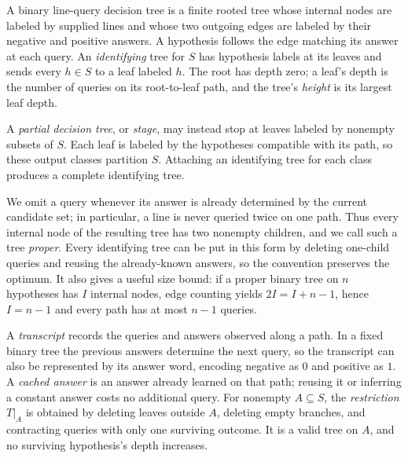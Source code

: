 \begin{definition}\label{def:decision-tree}
A binary line-query decision tree is a finite rooted tree whose
internal nodes are labeled by supplied lines and whose two outgoing
edges are labeled by their negative and positive answers. A
hypothesis follows the edge matching its answer at each query.
An \emph{identifying} tree for $S$ has hypothesis labels at its leaves
and sends every $h\in S$ to a leaf labeled $h$. The root has depth
zero; a leaf's depth is the number of queries on its root-to-leaf path,
and the tree's \emph{height} is its largest leaf depth.

A \emph{partial decision tree}, or \emph{stage}, may instead stop at
leaves labeled by nonempty subsets of $S$. Each leaf is labeled by
the hypotheses compatible with its path, so these output
classes partition $S$. Attaching an identifying tree for each class
produces a complete identifying tree.
\end{definition}

We omit a query whenever its answer is already determined by the
current candidate set; in particular, a line is never queried twice
on one path. Thus every internal node of the resulting tree has two
nonempty children, and we call such a tree \emph{proper}. Every
identifying tree can be put in this form by deleting one-child queries
and reusing the already-known answers, so the convention preserves
the optimum. It also gives a useful size bound: if a proper binary tree
on $n$ hypotheses has $I$ internal nodes, edge counting yields
$2I=I+n-1$, hence $I=n-1$ and every path has at most $n-1$ queries.

A \emph{transcript} records the queries and answers observed along
a path. In a fixed binary tree the previous answers determine the
next query, so the transcript can also be represented by its answer
word, encoding negative as $0$ and positive as $1$.
A \emph{cached answer} is an answer already learned on that path;
reusing it or inferring a constant answer costs no additional query.
For nonempty $A\subseteq S$, the \emph{restriction} $T|_A$ is obtained
by deleting leaves outside $A$, deleting empty branches, and
contracting queries with only one surviving outcome. It is a valid
tree on $A$, and no surviving hypothesis's depth increases.

